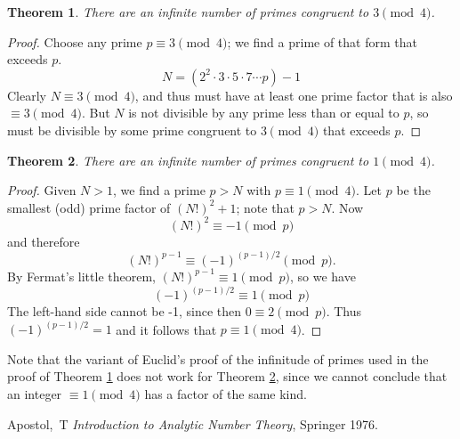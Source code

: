 \documentclass[12pt]{article}
\newtheorem{thm}{Theorem}
\theoremstyle{definition}
\begin{document}
\begin{thm} \label{thm:one}There are an infinite number of primes congruent to $3 \pmod 4$.
\end{thm}
\begin{proof}
Choose any prime $p\equiv 3\pmod 4$; we find a prime of that form that exceeds $p$.
\[N=(2^2\cdot 3\cdot 5\cdot 7\cdots p) - 1\]
Clearly $N\equiv 3\pmod 4$, and thus must have at least one prime factor that is also $\equiv 3\pmod 4$. But $N$ is not divisible by any prime less than or equal to $p$, so must be divisible by some prime congruent to $3\pmod 4$ that exceeds $p$.
\end{proof}

\begin{thm} \label{thm:two}There are an infinite number of primes congruent to $1\pmod 4$.
\end{thm}
\begin{proof}
Given $N>1$, we find a prime $p>N$ with $p\equiv 1\pmod 4$. Let $p$ be the smallest (odd) prime factor of $(N!)^2+1$; note that $p>N$. Now
\[(N!)^2\equiv -1\pmod p\]
and therefore
\[(N!)^{p-1}\equiv (-1)^{(p-1)/2}\pmod p.\]
By Fermat's little theorem, $(N!)^{p-1}\equiv 1\pmod p$, so we have
\[(-1)^{(p-1)/2}\equiv 1\pmod p\]
The left-hand side cannot be -1, since then $0\equiv 2\pmod p$. Thus $(-1)^{(p-1)/2}=1$ and it follows that $p\equiv 1\pmod 4$.
\end{proof}

Note that the variant of Euclid's proof of the infinitude of primes used in the proof of Theorem \ref{thm:one} does not work for Theorem \ref{thm:two}, since we cannot conclude that an integer $\equiv 1\pmod 4$ has a factor of the same kind.

\begin{thebibliography}{10}
Apostol,~T \emph{Introduction to Analytic Number Theory}, Springer 1976.
\end{thebibliography}
\end{document}
